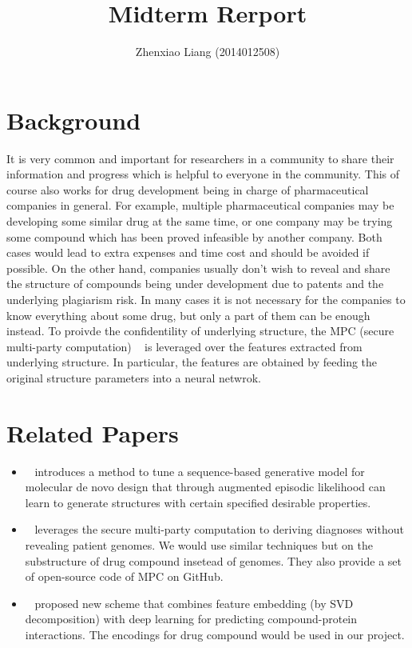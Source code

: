 \documentclass[]{article}
\title{Midterm Rerport}
\author{Zhenxiao Liang (2014012508)}
\begin{document}
\maketitle

\section{Background}

It is very common and important for researchers in a community to share their information and progress which is helpful to everyone in the community. This of course also works for drug development being in charge of pharmaceutical companies in general. For example, multiple pharmaceutical companies may be developing some similar drug at the same time, or one company may be trying some compound which has been proved infeasible by another company. Both cases would lead to extra expenses and time cost and should be avoided if possible. On the other hand, companies usually don’t wish to reveal and share the structure of compounds being under development due to patents and the underlying plagiarism risk. In many cases it is not necessary for the companies to know everything about some drug, but only a part of them can be enough instead. To proivde the confidentility of underlying structure, the MPC (secure multi-party computation) ~\cite{cramer2015secure} is leveraged over the features extracted from underlying structure. In particular, the features are obtained by feeding the original structure parameters into a neural netwrok.

\section{Related Papers}
\begin{itemize}
	\item
	~\cite{DBLP:journals/corr/OlivecronaBEC17} introduces a method to tune a sequence-based generative model for molecular de novo design that through augmented episodic likelihood can learn to generate structures with certain specified desirable properties.
	\item 
	~\cite{Jagadeesh692} leverages the secure multi-party computation to deriving diagnoses without revealing patient genomes. We would use similar techniques but on the substructure of drug compound insetead of genomes. They also provide a set of open-source code of MPC on GitHub.
	\item 
	~\cite{Wan086033} proposed new scheme that combines feature embedding (by SVD decomposition) with deep learning for predicting compound-protein interactions. The encodings for drug compound would be used in our project.
\end{itemize}
\end{document}
